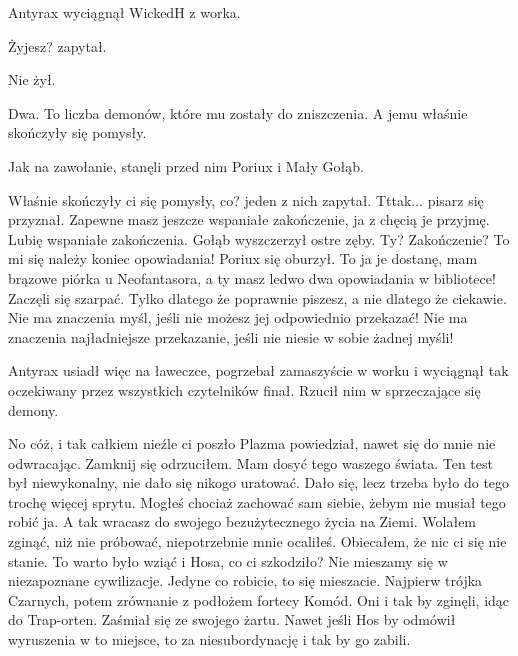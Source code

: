 \divider{}

Antyrax wyciągnął WickedH z worka.
\begin{dialogue}
\ds{} Żyjesz? \dm{} zapytał. 
\end{dialogue}
Nie żył.

Dwa.
To liczba demonów, które mu zostały do zniszczenia.
A jemu właśnie skończyły się pomysły.

Jak na zawołanie, stanęli przed nim Poriux i Mały Gołąb.
\begin{dialogue}
\ds{} Właśnie skończyły ci się pomysły, co? \dm{} jeden z nich zapytał.
\ds{} Tttak... \dm{} pisarz się przyznał.
\ds{} Zapewne masz jeszcze wspaniałe zakończenie, ja z chęcią je przyjmę. Lubię wspaniałe zakończenia. \dm{} Gołąb wyszczerzył ostre zęby.
\ds{} Ty? Zakończenie? To mi się należy koniec opowiadania! \dm{} Poriux się oburzył.
\ds{} To ja je dostanę, mam brązowe piórka u Neofantasora, a ty masz ledwo dwa opowiadania w bibliotece! \dm{} Zaczęli się szarpać.
\ds{} Tylko dlatego że poprawnie piszesz, a nie dlatego że ciekawie.
\ds{} Nie ma znaczenia myśl, jeśli nie możesz jej odpowiednio przekazać!
\ds{} Nie ma znaczenia najładniejsze przekazanie, jeśli nie niesie w sobie żadnej myśli!
\end{dialogue}

Antyrax usiadł więc na ławeczce, pogrzebał zamaszyście w worku i wyciągnął tak oczekiwany przez wszystkich czytelników finał.
Rzucił nim w sprzeczające się demony.

\divider{}

\begin{dialogue}
\ds{} No cóż, i tak całkiem nieźle ci poszło \dm{} Plazma powiedział, nawet się do mnie nie odwracając. 
\ds{} Zamknij się \dm{} odrzuciłem. \dm{} Mam dosyć tego waszego świata. Ten test był niewykonalny, nie dało się nikogo uratować.
\ds{} Dało się, lecz trzeba było do tego trochę więcej sprytu. Mogłeś chociaż zachować sam siebie, żebym nie musiał tego robić ja. A tak wracasz do swojego bezużytecznego życia na Ziemi.
\ds{} Wolałem zginąć, niż nie próbować, niepotrzebnie mnie ocaliłeś.
\ds{} Obiecałem, że nic ci się nie stanie.
\ds{} To warto było wziąć i Hosa, co ci szkodziło?
\ds{} Nie mieszamy się w niezapoznane cywilizacje.
\ds{} Jedyne co robicie, to się mieszacie. Najpierw trójka Czarnych, potem zrównanie z podłożem fortecy Komód.
\ds{} Oni i tak by zginęli, idąc do Trap-orten. \dm{} Zaśmiał się ze swojego żartu. \dm{} Nawet jeśli Hos by odmówił wyruszenia w to miejsce, to za niesubordynację i tak by go zabili.
\end{dialogue}

